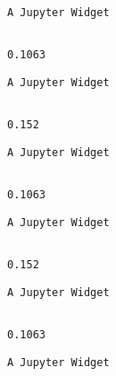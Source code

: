 \documentclass[11pt]{article}
\begin{document}
    
    \begin{verbatim}
A Jupyter Widget
    \end{verbatim}

    
    \begin{Verbatim}[commandchars=\\\{\}]

0.1063

    \end{Verbatim}

    
    \begin{verbatim}
A Jupyter Widget
    \end{verbatim}

    
    \begin{Verbatim}[commandchars=\\\{\}]

0.152

    \end{Verbatim}

    
    \begin{verbatim}
A Jupyter Widget
    \end{verbatim}

    
    \begin{Verbatim}[commandchars=\\\{\}]

0.1063

    \end{Verbatim}

    
    \begin{verbatim}
A Jupyter Widget
    \end{verbatim}

    
    \begin{Verbatim}[commandchars=\\\{\}]

0.152

    \end{Verbatim}

    
    \begin{verbatim}
A Jupyter Widget
    \end{verbatim}

    
    \begin{Verbatim}[commandchars=\\\{\}]

0.1063

    \end{Verbatim}

    
    \begin{verbatim}
A Jupyter Widget
    \end{verbatim}
\end{document}
